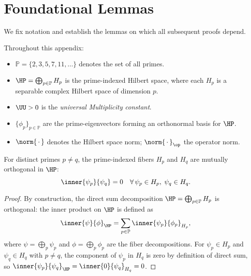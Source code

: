 \documentclass[12pt,letterpaper]{article}
\theoremstyle{definition}
\theoremstyle{remark}
\begin{document}
\section{Foundational Lemmas}
\label{sec:foundations}

We fix notation and establish the lemmas on which all subsequent proofs depend.

\begin{notation}
Throughout this appendix:
\begin{itemize}[noitemsep]
  \item $\mathbb{P} = \{2,3,5,7,11,\ldots\}$ denotes the set of all primes.
  \item $\HP = \bigoplus_{p\in\mathbb{P}} H_p$ is the prime-indexed Hilbert space,
        where each $H_p$ is a separable complex Hilbert space of dimension $p$.
  \item $\UU > 0$ is the \emph{universal Multiplicity constant}.
  \item $\{\phi_p\}_{p\in\mathbb{P}}$ are the prime-eigenvectors forming an
        orthonormal basis for $\HP$.
  \item $\norm{\,\cdot\,}$ denotes the Hilbert space norm; $\norm{\,\cdot\,}_\op$
        the operator norm.
\end{itemize}
\end{notation}

\begin{lemma}
\label{lem:orthogonality}
For distinct primes $p \neq q$, the prime-indexed fibers $H_p$ and $H_q$ are
mutually orthogonal in $\HP$:
\[
  \inner{\psi_p}{\psi_q} = 0
  \quad \forall\, \psi_p \in H_p,\; \psi_q \in H_q.
\]
\end{lemma}

\begin{proof}
By construction, the direct sum decomposition
$\HP = \bigoplus_{p\in\mathbb{P}} H_p$ is orthogonal: the inner product on
$\HP$ is defined as
\[
  \inner{\psi}{\phi}_{\HP}
  = \sum_{p\in\mathbb{P}} \inner{\psi_p}{\phi_p}_{H_p},
\]
where $\psi = \bigoplus_p \psi_p$ and $\phi = \bigoplus_p \phi_p$ are the
fiber decompositions. For $\psi_p \in H_p$ and $\psi_q \in H_q$ with $p\neq q$,
the component of $\psi_p$ in $H_q$ is zero by definition of direct sum, so
$\inner{\psi_p}{\psi_q}_{\HP} = \inner{0}{\psi_q}_{H_q} = 0$.
\end{proof}
\end{document}
